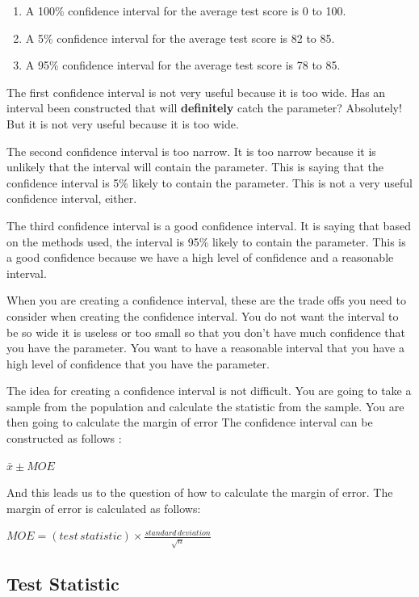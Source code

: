 \documentclass[
  letterpaper,
  DIV=11,
  numbers=noendperiod]{scrreprt}
\begin{document}
\begin{enumerate}
\def\labelenumi{\arabic{enumi}.}
\item
  A 100\% confidence interval for the average test score is 0 to 100.
\item
  A 5\% confidence interval for the average test score is 82 to 85.
\item
  A 95\% confidence interval for the average test score is 78 to 85.
\end{enumerate}

The first confidence interval is not very useful because it is too wide.
Has an interval been constructed that will \textbf{definitely} catch the
parameter? Absolutely! But it is not very useful because it is too wide.

The second confidence interval is too narrow. It is too narrow because
it is unlikely that the interval will contain the parameter. This is
saying that the confidence interval is 5\% likely to contain the
parameter. This is not a very useful confidence interval, either.

The third confidence interval is a good confidence interval. It is
saying that based on the methods used, the interval is 95\% likely to
contain the parameter. This is a good confidence because we have a high
level of confidence and a reasonable interval.

When you are creating a confidence interval, these are the trade offs
you need to consider when creating the confidence interval. You do not
want the interval to be so wide it is useless or too small so that you
don't have much confidence that you have the parameter. You want to have
a reasonable interval that you have a high level of confidence that you
have the parameter.

The idea for creating a confidence interval is not difficult. You are
going to take a sample from the population and calculate the statistic
from the sample. You are then going to calculate the margin of error The
confidence interval can be constructed as follows :

\(\bar{x} \pm MOE\)

And this leads us to the question of how to calculate the margin of
error. The margin of error is calculated as follows:

\(\displaystyle{MOE = (test\,statistic) \times \frac{standard\,deviation}{\sqrt{n}}}\)

\subsection*{Test Statistic}\label{test-statistic}
\end{document}
